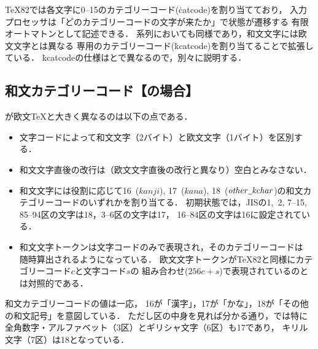 \documentclass[a4paper,11pt,nomag,dvipdfmx]{jsarticle}
\def\_{\leavevmode\vrule width .45em height -.2ex depth .3ex\relax}
\begin{document}
\TeX82では各文字に0--15のカテゴリーコード(\.{catcode})を割り当てており，
入力プロセッサは「どのカテゴリーコードの文字が来たか」で状態が遷移する
有限オートマトンとして記述できる\cite{topic}．
\pTeX 系列においても同様であり，和文文字には欧文文字とは異なる
専用のカテゴリーコード(\.{kcatcode})を割り当てることで拡張している．
\.{kcatcode}の仕様は\pTeX と\upTeX で異なるので，別々に説明する．

\subsection{和文カテゴリーコード【\pTeX の場合】}
\label{sec:ptex_kcat}
\pTeX が欧文\TeX と大きく異なるのは以下の点である．
\begin{itemize}
  \item 文字コードによって和文文字（2バイト）と欧文文字（1バイト）を区別する．
  \item 和文文字直後の改行は（欧文文字直後の改行と異なり）空白とみなさない．
  \item 和文文字には役割に応じて16~($\mathit{kanji}$), 17~($\mathit{kana}$),
    18~($\mathit{other\_kchar}$)の和文カテゴリーコードのいずれかを割り当てる．
    初期状態では，JISの1,~2, 7--15, 85--94区の文字は18，3--6区の文字は17，
    16--84区の文字は16に設定されている．
  \item 和文文字トークンは文字コードのみで表現され，そのカテゴリーコードは
    随時算出されるようになっている．
    欧文文字トークンが\TeX82と同様にカテゴリーコード$c$と文字コード$s$の
    組み合わせ($256c+s$)で表現されているのとは対照的である．
\end{itemize}
和文カテゴリーコードの値は一応，
16が「漢字」，17が「かな」，18が「その他の和文記号」を意図している．
ただし区の中身を見れば分かる通り，\pTeX では特に
全角数字・アルファベット（3区）とギリシャ文字（6区）も17であり，
キリル文字（7区）は18となっている．
\end{document}
